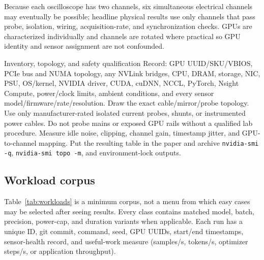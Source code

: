 \documentclass[sigplan,anonymous,review,nonacm]{acmart}
\begin{document}
Because each oscilloscope has two channels, six simultaneous electrical channels may eventually be possible; headline physical results use only channels that pass probe, isolation, wiring, acquisition-rate, and synchronization checks. GPUs are characterized individually and channels are rotated where practical so GPU identity and sensor assignment are not confounded.

\begin{experimentbox}{Inventory, topology, and safety qualification}
Record: GPU UUID/SKU/VBIOS, PCIe bus and NUMA topology, any NVLink bridges, CPU, DRAM, storage, NIC, PSU, OS/kernel, NVIDIA driver, CUDA, cuDNN, NCCL, PyTorch, Nsight Compute, power/clock limits, ambient conditions, and every sensor model/firmware/rate/resolution. Draw the exact cable/mirror/probe topology. Use only manufacturer-rated isolated current probes, shunts, or instrumented power cables. Do not probe mains or exposed GPU rails without a qualified lab procedure. Measure idle noise, clipping, channel gain, timestamp jitter, and GPU-to-channel mapping. Put the resulting table in the paper and archive \texttt{nvidia-smi -q}, \texttt{nvidia-smi topo -m}, and environment-lock outputs.
\end{experimentbox}

\subsection{Workload corpus}

Table~\ref{tab:workloads} is a minimum corpus, not a menu from which easy cases may be selected after seeing results. Every class contains matched model, batch, precision, power-cap, and duration variants when applicable. Each run has a unique ID, git commit, command, seed, GPU UUIDs, start/end timestamps, sensor-health record, and useful-work measure (samples/s, tokens/s, optimizer steps/s, or application throughput).
\end{document}
